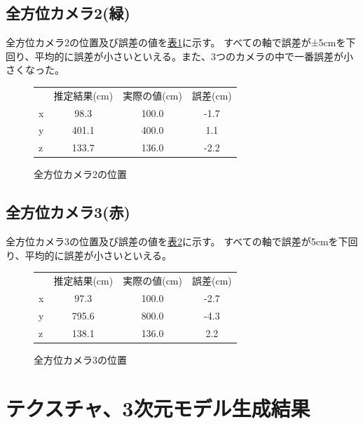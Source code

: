 \documentclass[]{jarticle}          %
\begin{document}
\subsection{全方位カメラ2(緑)}
全方位カメラ2の位置及び誤差の値を\hyperref[table2]{表\ref{table2}}に示す。
すべての軸で誤差が±5cmを下回り、平均的に誤差が小さいといえる。また、3つのカメラの中で一番誤差が小さくなった。

\begin{figure}[H]
  \begin{center}
    \begin{tabular}{lccc}
    & 推定結果(cm) & 実際の値(cm) & 誤差(cm) \\
    x & 98.3 & 100.0 & -1.7 \\
    y & 401.1 & 400.0 & 1.1 \\
    z & 133.7 & 136.0 & -2.2
    \end{tabular}
  \end{center}
  \caption{全方位カメラ2の位置}
  \label{table2}
\end{figure}

\subsection{全方位カメラ3(赤)}
全方位カメラ3の位置及び誤差の値を\hyperref[table3]{表\ref{table3}}に示す。
すべての軸で誤差が5cmを下回り、平均的に誤差が小さいといえる。
\begin{figure}[H]
  \begin{center}
    \begin{tabular}{lccc}
    & 推定結果(cm) & 実際の値(cm) & 誤差(cm) \\
    x & 97.3 & 100.0 & -2.7 \\
    y & 795.6 & 800.0 & -4.3 \\
    z & 138.1 & 136.0 & 2.2 
    \end{tabular}
  \end{center}
  \caption{全方位カメラ3の位置}
  \label{table3}
\end{figure}

\section{テクスチャ、3次元モデル生成結果}
\end{document}
